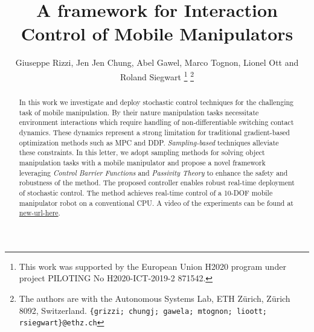 \documentclass[letterpaper, 10 pt, conference]{ieeeconf}  %
\title{\LARGE \bf
A framework for Interaction Control of Mobile Manipulators
}
\author{Giuseppe Rizzi, Jen Jen Chung, Abel Gawel, Marco Tognon, Lionel Ott and Roland Siegwart%
\thanks{This work was supported by the European Union H2020 program under project PILOTING No H2020-ICT-2019-2 871542.}
\thanks{The authors are with the Autonomous Systems Lab, ETH Z\"urich, Z\"urich 8092, Switzerland. {\tt\small\{grizzi; chungj; gawela; mtognon; lioott; rsiegwart\}@ethz.ch}}%
}
\begin{document}
\maketitle
\thispagestyle{empty}
\pagestyle{empty}


\begin{abstract}

In this work we investigate and deploy stochastic control techniques for the challenging task of mobile manipulation. By their nature manipulation tasks necessitate environment interactions which require handling of non-differentiable switching contact dynamics. These dynamics represent a strong limitation for traditional gradient-based optimization methods such as MPC and DDP. \emph{Sampling-based} techniques alleviate these constraints. In this letter, we adopt sampling methods for solving object manipulation tasks with a mobile manipulator and propose a novel framework leveraging \emph{Control Barrier Functions} and \emph{Passivity Theory} to enhance the safety and robustness of the method. The proposed controller enables robust real-time deployment of stochastic control. The method achieves real-time control of a 10-DOF mobile manipulator robot on a conventional CPU. A video of the experiments can be found at \url{new-url-here}.
  
\end{abstract}


















\end{document}

